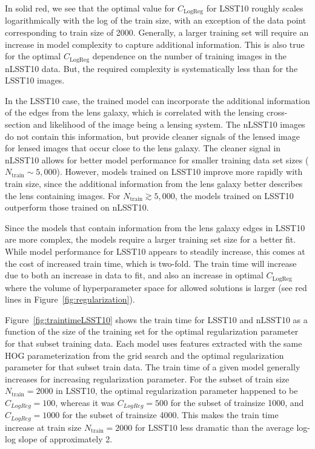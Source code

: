 \documentclass{emulateapj}
\def\gsim{\gtrsim}
\begin{document}
In solid red, we see that the optimal value for $C_\text{LogReg}$ for
LSST10 roughly scales logarithmically with the log of the train size,
with an exception of the data point corresponding to train size of
2000.  Generally, a larger training set will require an increase in
model complexity to capture additional information.  This is also true
for the optimal $C_\text{LogReg}$ dependence on the number of training
images in the nLSST10 data.  But, the required complexity is
systematically less than for the LSST10 images.  

In the LSST10 case, the trained model can incorporate the additional
information of the edges from the lens galaxy, which is correlated
with the lensing cross-section and likelihood of the image being a
lensing system.  The nLSST10 images do not contain this information,
but provide cleaner signals of the lensed image for lensed images that
occur close to the lens galaxy.  The cleaner signal in nLSST10 allows
for better model performance for smaller training data set sizes
($N_\text{train}\sim5,000$).  However, models trained on LSST10
improve more rapidly with train size, since the additional information
from the lens galaxy better describes the lens containing images.  For
$N_\text{train}\gsim 5,000$, the models trained on LSST10 outperform
  those trained on nLSST10.

Since the models that contain information from the lens galaxy edges
in LSST10 are more complex, the models require a larger training set
size for a better fit.  While model performance for LSST10 appears to
steadily increase, this comes at the cost of increased train time,
which is two-fold.  The train time will increase due to both an
increase in data to fit, and also an increase in optimal
$C_\text{LogReg}$ where the volume of hyperparameter space for allowed
solutions is larger (see red lines in
Figure~\ref{fig:regularization}).

Figure~\ref{fig:traintimeLSST10} shows the train time for LSST10 and
nLSST10 as a function of the size of the training set for the optimal
regularization parameter for that subset training data.  Each model
uses features extracted with the same HOG parameterization from the
grid search and the optimal regularization parameter for that subset
train data.  The train time of a given model generally increases for
increasing regularization parameter.  For the subset of train size
$N_\text{train}=2000$ in LSST10, the optimal regularization parameter
happened to be $C_{LogReg}=100$, whereas it was $C_{LogReg}=500$ for
the subset of trainsize 1000, and $C_{LogReg}=1000$ for the subset of
trainsize 4000.  This makes the train time increase at train size
$N_\text{train}=2000$ for LSST10 less dramatic than the average
log-log slope of approximately 2.
\end{document}
